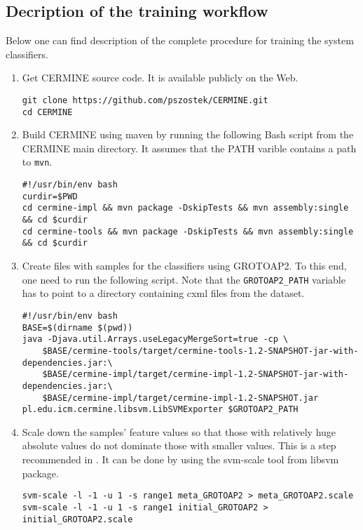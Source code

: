 \begin{appendix}
\noappendicestocpagenum
\addappheadtotoc
\chapter{Decription of the training workflow}
\label{appendix:training_workflow}
Below one can find description of the complete procedure for training the system classifiers.
\begin{enumerate}
\item Get CERMINE source code. It is available publicly on the Web.
\lstset{language=bash}
\begin{lstlisting}
git clone https://github.com/pszostek/CERMINE.git
cd CERMINE
\end{lstlisting}
\item Build CERMINE using maven by running the following Bash script from the CERMINE main directory. It assumes that the PATH varible contains a path to \verb+mvn+.
\begin{lstlisting}
#!/usr/bin/env bash
curdir=$PWD
cd cermine-impl && mvn package -DskipTests && mvn assembly:single && cd $curdir
cd cermine-tools && mvn package -DskipTests && mvn assembly:single && cd $curdir
\end{lstlisting}
\item Create files with samples for the classifiers using GROTOAP2. To this end, one need to run the following script. Note that the \verb+GROTOAP2_PATH+ variable has to point to a directory containing cxml files from the dataset.
\begin{lstlisting}
#!/usr/bin/env bash
BASE=$(dirname $(pwd))
java -Djava.util.Arrays.useLegacyMergeSort=true -cp \
    $BASE/cermine-tools/target/cermine-tools-1.2-SNAPSHOT-jar-with-dependencies.jar:\
    $BASE/cermine-impl/target/cermine-impl-1.2-SNAPSHOT-jar-with-dependencies.jar:\
    $BASE/cermine-impl/target/cermine-impl-1.2-SNAPSHOT.jar pl.edu.icm.cermine.libsvm.LibSVMExporter $GROTOAP2_PATH
\end{lstlisting}
\item Scale down the samples' feature values so that those with relatively huge absolute values do not dominate those with smaller values. This is a step recommended in \cite{Chih-WeiHsu2010}. It can be done by using the svm-scale tool from libsvm package.
\begin{lstlisting}
svm-scale -l -1 -u 1 -s range1 meta_GROTOAP2 > meta_GROTOAP2.scale
svm-scale -l -1 -u 1 -s range1 initial_GROTOAP2 > initial_GROTOAP2.scale
\end{lstlisting}

\end{enumerate}
\end{appendix}
